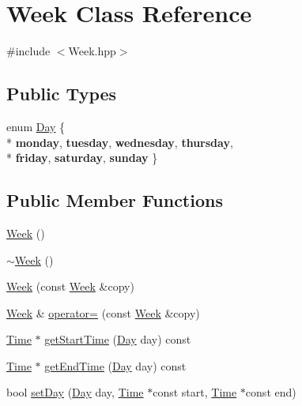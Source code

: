 \hypertarget{class_week}{}\section{Week Class Reference}
\label{class_week}


{\ttfamily \#include $<$Week.\+hpp$>$}

\subsection*{Public Types}
\begin{DoxyCompactItemize}
\item 
enum \hyperlink{class_week_a1f85a077c83820a97fad2a6d50c3a075}{Day} \{ \\*
{\bfseries monday}, 
{\bfseries tuesday}, 
{\bfseries wednesday}, 
{\bfseries thursday}, 
\\*
{\bfseries friday}, 
{\bfseries saturday}, 
{\bfseries sunday}
 \}
\end{DoxyCompactItemize}
\subsection*{Public Member Functions}
\begin{DoxyCompactItemize}
\item 
\hyperlink{class_week_a95d336c880593bc5d5ca922fbe68d0b9}{Week} ()
\item 
\hyperlink{class_week_a9d588405eac8024d4c9465638c348d98}{$\sim$\+Week} ()
\item 
\hyperlink{class_week_a7e559bbb153198ffede62c54522a5be5}{Week} (const \hyperlink{class_week}{Week} \&copy)
\item 
\hyperlink{class_week}{Week} \& \hyperlink{class_week_ada66752c1d9311360948683878c91142}{operator=} (const \hyperlink{class_week}{Week} \&copy)
\item 
\hyperlink{class_time}{Time} $\ast$ \hyperlink{class_week_a15f00086611c7dce7631bf774933ba0c}{get\+Start\+Time} (\hyperlink{class_week_a1f85a077c83820a97fad2a6d50c3a075}{Day} day) const 
\item 
\hyperlink{class_time}{Time} $\ast$ \hyperlink{class_week_a8e638bfa0e8ff02265e6e2d18fd84604}{get\+End\+Time} (\hyperlink{class_week_a1f85a077c83820a97fad2a6d50c3a075}{Day} day) const 
\item 
bool \hyperlink{class_week_ab2ff0ec6dbf2ac363d80e18e01f89e49}{set\+Day} (\hyperlink{class_week_a1f85a077c83820a97fad2a6d50c3a075}{Day} day, \hyperlink{class_time}{Time} $\ast$const start, \hyperlink{class_time}{Time} $\ast$const end)
\end{DoxyCompactItemize}
